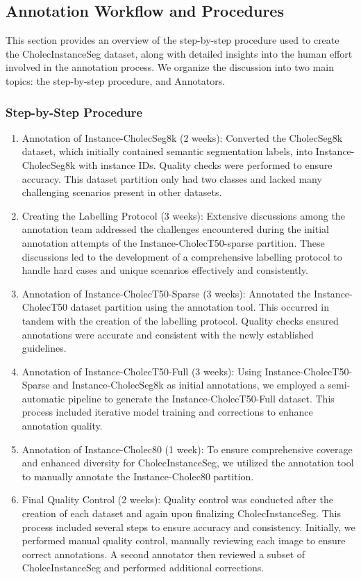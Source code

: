 \subsection{Annotation Workflow and Procedures}
This section provides an overview of the step-by-step procedure used to create the CholecInstanceSeg dataset, along with detailed insights into the human effort involved in the annotation process. We organize the discussion into two main topics: the step-by-step procedure, and Annotators.

\subsubsection{Step-by-Step Procedure}

\begin{enumerate}
    \item Annotation of Instance-CholecSeg8k (2 weeks): Converted the CholecSeg8k dataset, which initially contained semantic segmentation labels, into Instance-CholecSeg8k with instance IDs. Quality checks were performed to ensure accuracy. This dataset partition only had two classes and lacked many challenging scenarios present in other datasets.
    \item Creating the Labelling Protocol (3 weeks): Extensive discussions among the annotation team addressed the challenges encountered during the initial annotation attempts of the Instance-CholecT50-sparse partition. These discussions led to the development of a comprehensive labelling protocol to handle hard cases and unique scenarios effectively and consistently.
    \item Annotation of Instance-CholecT50-Sparse (3 weeks): Annotated the Instance-CholecT50 dataset partition using the annotation tool. This occurred in tandem with the creation of the labelling protocol. Quality checks ensured annotations were accurate and consistent with the newly established guidelines.
    \item Annotation of Instance-CholecT50-Full (3 weeks): Using Instance-CholecT50-Sparse and Instance-CholecSeg8k as initial annotations, we employed a semi-automatic pipeline to generate the Instance-CholecT50-Full dataset. This process included iterative model training and corrections to enhance annotation quality.
    \item Annotation of Instance-Cholec80 (1 week): To ensure comprehensive coverage and enhanced diversity for CholecInstanceSeg, we utilized the annotation tool to manually annotate the Instance-Cholec80 partition.
    \item Final Quality Control (2 weeks): Quality control was conducted after the creation of each dataset and again upon finalizing CholecInstanceSeg. This process included several steps to ensure accuracy and consistency. Initially, we performed manual quality control, manually reviewing each image to ensure correct annotations. A second annotator then reviewed a subset of CholecInstanceSeg and performed additional corrections.


\end{enumerate}
